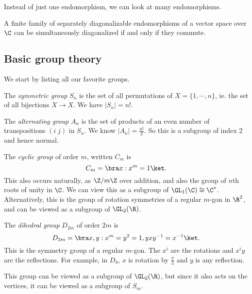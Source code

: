 \documentclass[a4paper]{article}
\begin{document}
Instead of just one endomorphism, we can look at many endomorphisms.

\begin{prop}
  A finite family of separately diagonalizable endomorphisms of a vector space over $\C$ can be simultaneously diagonalized if and only if they commute.
\end{prop}

\subsection{Basic group theory}
We start by listing all our favorite groups.

\begin{defi}
  The \emph{symmetric group} $S_n$ is the set of all permutations of $X = \{1, \cdots, n\}$, ie. the set of all bijections $X \to X$. We have $|S_n| = n!$.
\end{defi}

\begin{defi}
  The \emph{alternating group} $A_n$ is the set of products of an even number of transpositions $(i\; j)$ in $S_n$. We know $|A_n| = \frac{n!}{2}$. So this is a subgroup of index 2 and hence normal.
\end{defi}

\begin{defi}
  The \emph{cyclic group} of order $m$, written $C_m$ is
  \[
    C_m = \bra x: x^m = 1\ket.
  \]
  This also occurs naturally, as $\Z/m\Z$ over addition, and also the group of $n$th roots of unity in $\C$. We can view this as a subgroup of $\GL_1(\C) \cong \C^*$. Alternatively, this is the group of rotation symmetries of a regular $m$-gon in $\R^2$, and can be viewed as a subgroup of $\GL_2(\R)$.
\end{defi}

\begin{defi}
  The \emph{dihedral group} $D_{2m}$ of order $2m$ is
  \[
    D_{2m} = \bra x, y: x^m = y^2 = 1, yxy^{-1} = x^{-1}\ket.
  \]
  This is the symmetry group of a regular $m$-gon. The $x^i$ are the rotations and $x^i y$ are the reflections. For example, in $D_8$, $x$ is rotation by $\frac{\pi}{2}$ and $y$ is any reflection.

  This group can be viewed as a subgroup of $\GL_2(\R)$, but since it also acts on the vertices, it can be viewed as a subgroup of $S_m$.
\end{defi}
\end{document}
